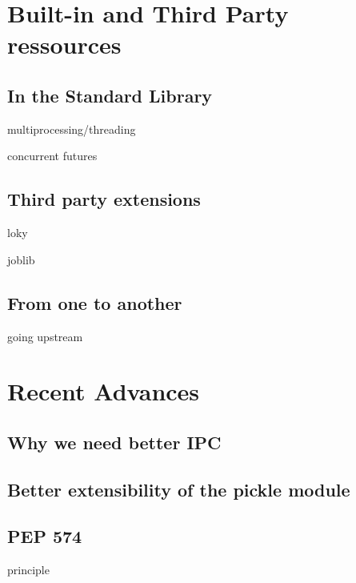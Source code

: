 \documentclass[14pt, usenames,dvipsnames]{beamer} %
\begin{document}
\section{Built-in and Third Party ressources}
    \subsection{In the Standard Library}
        \begin{frame}[t]{multiprocessing/threading}

        \end{frame}
        \begin{frame}[t]{concurrent futures}

        \end{frame}
    \subsection{Third party extensions}
        \begin{frame}[t]{loky}

        \end{frame}
        \begin{frame}[t]{joblib}

        \end{frame}
    \subsection{From one to another}
        \begin{frame}[t]{going upstream}

        \end{frame}

\section{Recent Advances}
\subsection{Why we need better IPC}
\subsection{Better extensibility of the pickle module}
\subsection{PEP 574}
    \begin{frame}[t]{principle}
    \end{frame}
\end{document}
